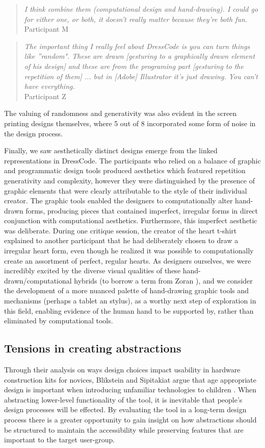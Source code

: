 \documentclass{sigchi}
\begin{document}
\begin{quote}
\textit{I think combine them (computational design and hand-drawing). I could go for either one, or both, it doesn't really matter because they're both fun.}
\\Participant M
\end{quote}
\begin{quote}
\textit{The important thing I really feel about DressCode is you can turn things like ''random". These are drawn [gesturing to a graphically drawn element of his design] and these are from the programing part [gesturing to the repetition of them] ... but in [Adobe] Illustrator it's just drawing. You can't have everything.}
\\Participant Z
\end{quote}
The valuing of randomness and generativity was also evident in the screen printing designs themselves, where 5 out of 8 incorporated some form of noise in the design process. 

Finally, we saw aesthetically distinct designs emerge from the linked representations in DressCode. The participants who relied on a balance of graphic and programmatic design tools produced aesthetics which featured repetition generativity and complexity, however they were distinguished by the presence of graphic elements that were clearly attributable to the style of their individual creator. The graphic tools enabled the designers to computationally alter hand-drawn forms, producing pieces that contained imperfect, irregular forms in direct conjunction with computational aesthetics. Furthermore, this imperfect aesthetic was deliberate. During one critique session, the creator of the heart t-shirt explained to another participant that he had deliberately chosen to draw a irregular heart form, even though he realized it was possible to computationally create an assortment of perfect, regular hearts. As designers ourselves, we were incredibly excited by the diverse visual qualities of these hand-drawn/computational hybrids (to borrow a term from Zoran \cite{zoran_tochi}), and we consider the development of a more nuanced palette of hand-drawing graphic tools and mechanisms (perhaps a tablet an stylus), as a worthy next step of exploration in this field, enabling evidence of the human hand to be supported by, rather than eliminated by computational tools.

\subsection{Tensions in creating abstractions }
Through their analysis on ways design choices impact usability in hardware construction kits for novices, Blikstein and Sipitakiat argue that age appropriate design is important when introducing unfamiliar technologies to children \cite{blik}. When abstracting lower-level functionality of the tool, it is inevitable that people's design processes will be effected. By evaluating the tool in a long-term design process there is a greater opportunity to gain insight on how abstractions should be structured to maintain the accessibility while preserving features that are important to the target user-group. 
\end{document}
